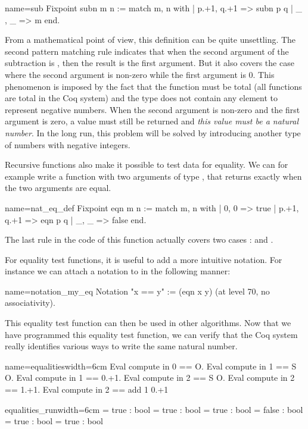 \begin{coq}{name=sub}{}
Fixpoint subn m n :=
  match m, n with
  | p.+1, q.+1 => subn p q
  | _ , _ => m
  end.
\end{coq}
From a mathematical point of view, this definition can be quite
unsettling.  The second pattern matching rule indicates that when
the second argument of the subtraction is , then the result is
the first argument.  But it also covers the case where the second
argument is non-zero while the first argument is 0.  This phenomenon
is imposed by the fact that the function must be total (all functions
are total in the Coq system) and the type  does not contain any
element to represent negative numbers.  When the second argument is non-zero
and the first argument is zero, a value must still be returned and
{\em this value must be a natural number}.  In the long run, this
problem will be solved by introducing another type of numbers with
negative integers.

Recursive functions also make it possible to test data for
equality. We can for example write a function with two arguments of
type , that
returns  exactly when the two arguments are equal.

\begin{coq}{name=nat_eq_def}{}
Fixpoint eqn m n :=
  match m, n with
  | 0, 0 => true
  | p.+1, q.+1 => eqn p q
  | _, _ => false
  end.
\end{coq}
The last rule in the code of this function actually covers two cases :
 and .

For equality test functions, it is useful to add a more intuitive
notation.  For instance we can attach a notation to  in
the following manner:

\begin{coq}{name=notation_my_eq}{}
Notation "x == y" := (eqn x y) (at level 70, no associativity).
\end{coq}
This equality test function can then be used in other algorithms.  Now
that we have programmed this equality test function, we can verify
that the Coq system really identifies various ways to write the same
natural number.

\begin{coq}{name=equalities}{width=6cm}
Eval compute in 0 == O.
Eval compute in 1 == S O.
Eval compute in 1 == 0.+1.
Eval compute in 2 == S O.
Eval compute in 2 == 1.+1.
Eval compute in 2 == add 1 0.+1
\end{coq}
\begin{coqout}{equalities_run}{width=6cm}
= true : bool
= true : bool
= true : bool
= false : bool
= true : bool
= true : bool
\end{coqout}

